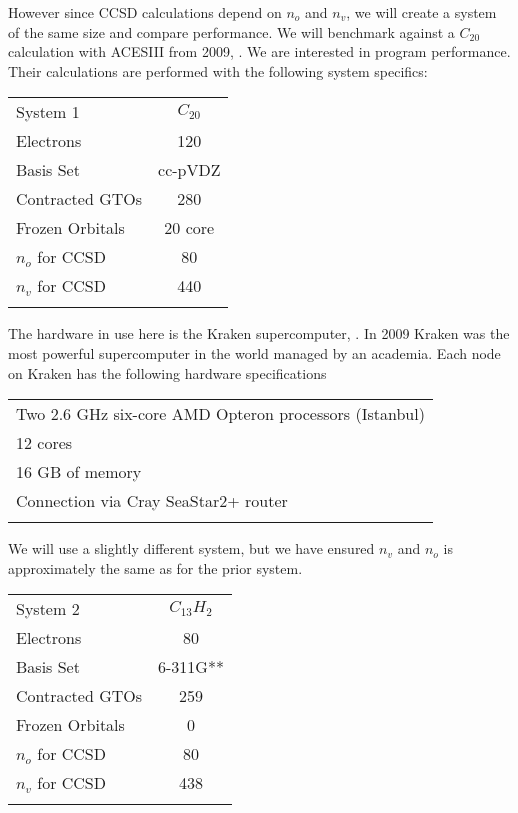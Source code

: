 However since CCSD calculations depend on $n_o$ and $n_v$, we will create a system of the same size and compare performance. We will benchmark against a $C_{20}$ calculation with ACESIII from 2009, \cite{aces_non_ref}. We are interested in program performance. Their calculations are performed with the following system specifics: \\

\begin{center}
\begin{tabular}{ l c}
	\hline
  	System 1 & $C_{20}$\\
  	Electrons & 120 \\
  	Basis Set & cc-pVDZ\\
  	Contracted GTOs & 280 \\
  	Frozen Orbitals & 20 core\\
  	$n_o$ for CCSD & 80\\
  	$n_v$ for CCSD & 440\\ \hline
  	\\
	\end{tabular}
\end{center}

The hardware in use here is the Kraken supercomputer, \cite{kraken_citation}. In 2009 Kraken was the most powerful supercomputer in the world managed by an academia. Each node on Kraken has the following hardware specifications

\begin{center}
\begin{tabular}{ l }
	\hline
  	Two 2.6 GHz six-core AMD Opteron processors (Istanbul)\\
    12 cores\\
    16 GB of memory\\
    Connection via Cray SeaStar2+ router\\ \hline
  	\\
	\end{tabular}
\end{center}

We will use a slightly different system, but we have ensured $n_v$ and $n_o$ is approximately the same as for the prior system.

\begin{center}
\begin{tabular}{ l c}
	\hline
  	System 2 & $C_{13} H_2$\\
  	Electrons & 80 \\
  	Basis Set & 6-311G** \\
  	Contracted GTOs & 259 \\
  	Frozen Orbitals & 0 \\
  	$n_o$ for CCSD & 80 \\
  	$n_v$ for CCSD & 438 \\ \hline
  	\\
	\end{tabular}
\end{center}

